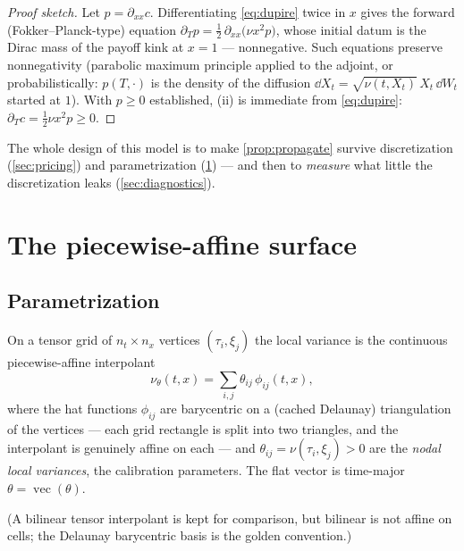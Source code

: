 \documentclass[11pt]{article}
\begin{document}
\begin{proof}[Proof sketch]
Let $p=\partial_{xx}c$. Differentiating \eqref{eq:dupire} twice in $x$ gives
the forward (Fokker--Planck-type) equation
$\partial_Tp=\tfrac12\,\partial_{xx}\!\big(\nu x^2p\big)$, whose initial datum
is the Dirac mass of the payoff kink at $x=1$ --- nonnegative. Such equations
preserve nonnegativity (parabolic maximum principle applied to the adjoint, or
probabilistically: $p(T,\cdot)$ is the density of the diffusion
$\dd X_t=\sqrt{\nu(t,X_t)}\,X_t\,\dd W_t$ started at $1$). With $p\ge0$
established, (ii) is immediate from \eqref{eq:dupire}:
$\partial_Tc=\tfrac12\nu x^2p\ge0$.
\end{proof}

The whole design of this model is to make \cref{prop:propagate} survive
discretization (\cref{sec:pricing}) and parametrization (\cref{sec:p1}) ---
and then to \emph{measure} what little the discretization leaks
(\cref{sec:diagnostics}).

\section{The piecewise-affine surface}
\label{sec:p1}

\subsection{Parametrization}

\begin{definition}
\label{def:p1}
On a tensor grid of $n_t\times n_x$ vertices $(\tau_i,\xi_j)$ the local
variance is the continuous piecewise-affine interpolant
\begin{equation}
\nu_\theta(t,x)=\sum_{i,j}\theta_{ij}\,\phi_{ij}(t,x),
\label{eq:p1}
\end{equation}
where the hat functions $\phi_{ij}$ are barycentric on a (cached Delaunay)
triangulation of the vertices --- each grid rectangle is split into two
triangles, and the interpolant is genuinely affine on each --- and
$\theta_{ij}=\nu(\tau_i,\xi_j)>0$ are the \emph{nodal local variances}, the
calibration parameters. The flat vector is time-major
$\theta=\operatorname{vec}(\theta)$.
\end{definition}

(A bilinear tensor interpolant is kept for comparison, but bilinear is not
affine on cells; the Delaunay barycentric basis is the golden convention.)
\end{document}
